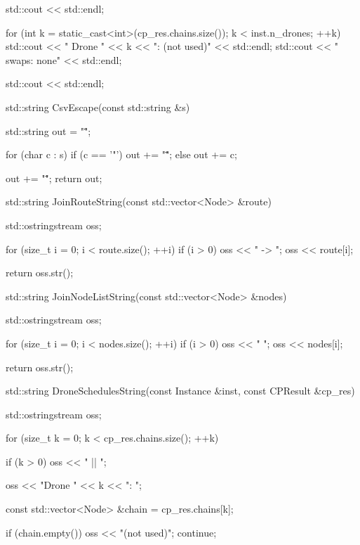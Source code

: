 {{{{                std::cout << std::endl;
            }

            for (int k = static_cast<int>(cp_res.chains.size()); k < inst.n_drones; ++k)
            {
                std::cout << "  Drone " << k << ": (not used)" << std::endl;
                std::cout << "           swaps: none" << std::endl;
            }

            std::cout << std::endl;
        }

        std::string CsvEscape(const std::string &s)
        {
            std::string out = "\"";

            for (char c : s)
            {
                if (c == '"')
                {
                    out += "\"\"";
                }
                else
                {
                    out += c;
                }
            }

            out += "\"";
            return out;
        }

        std::string JoinRouteString(const std::vector<Node> &route)
        {
            std::ostringstream oss;

            for (size_t i = 0; i < route.size(); ++i)
            {
                if (i > 0)
                {
                    oss << " -> ";
                }
                oss << route[i];
            }

            return oss.str();
        }

        std::string JoinNodeListString(const std::vector<Node> &nodes)
        {
            std::ostringstream oss;

            for (size_t i = 0; i < nodes.size(); ++i)
            {
                if (i > 0)
                {
                    oss << " ";
                }
                oss << nodes[i];
            }

            return oss.str();
        }

        std::string DroneSchedulesString(const Instance &inst, const CPResult &cp_res)
        {
            std::ostringstream oss;

            for (size_t k = 0; k < cp_res.chains.size(); ++k)
            {
                if (k > 0)
                {
                    oss << " || ";
                }

                oss << "Drone " << k << ": ";

                const std::vector<Node> &chain = cp_res.chains[k];

                if (chain.empty())
                {
                    oss << "(not used)";
                    continue;
                }

}}}}
